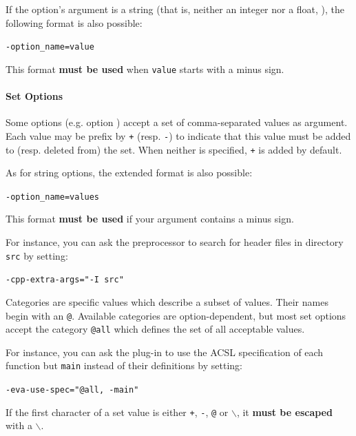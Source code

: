 If the option's argument is a
string (that is, neither an integer nor a float, \etc), the following
format is also possible:
\begin{commands}
\texttt{-option\_name=value}
\end{commands}

\begin{important}
This format \textbf{must be used} when \texttt{value} starts with a minus sign.
\end{important}

\paragraph{Set Options}

Some options (e.g. option ) accept a set of
comma-separated values as argument. Each value may be prefix by \texttt{+}
(resp. \texttt{-}) to indicate that this value must be added to (resp. deleted
from) the set. When neither is specified, \texttt{+} is added by default.

As for string options, the extended format is also possible:
\begin{commands}
\texttt{-option\_name=values}
\end{commands}

\begin{important}
This format \textbf{must be used} if your argument contains a minus sign.
\end{important}

For instance, you can ask the \C preprocessor to search for header files in
directory \texttt{src} by setting:
\begin{commands}
\texttt{-cpp-extra-args="-I src"}
\end{commands}

Categories are specific values which describe a subset of values. Their names
begin with an \texttt{@}. Available categories are option-dependent, but most
set options accept the category \texttt{@all} which defines the set of all
acceptable values.

For instance, you can ask the \Value plug-in to use the ACSL specification of
each function but \texttt{main} instead of their definitions by setting:
\begin{commands}
\texttt{-eva-use-spec="@all, -main"}
\end{commands}

\begin{important}
If the first character of a set value is either \texttt{+}, \texttt{-},
\texttt{@} or $\backslash$, it \textbf{must be escaped} with a $\backslash$.
\end{important}

